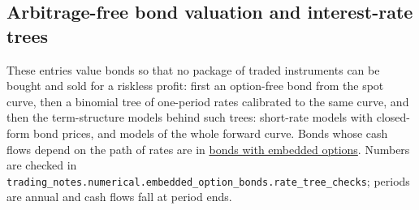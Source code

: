 \subsection{Arbitrage-free bond valuation and interest-rate trees}

These entries value bonds so that no package of traded instruments can be bought and sold for a riskless profit: first an option-free bond from the spot curve, then a binomial tree of one-period rates calibrated to the same curve, and then the term-structure models behind such trees: short-rate models with closed-form bond prices, and models of the whole forward curve. Bonds whose cash flows depend on the path of rates are in \hyperref[meth:callable-putable-bond-valuation]{bonds with embedded options}. Numbers are checked in \nolinkurl{trading_notes.numerical.embedded_option_bonds.rate_tree_checks}; periods are annual and cash flows fall at period ends.

